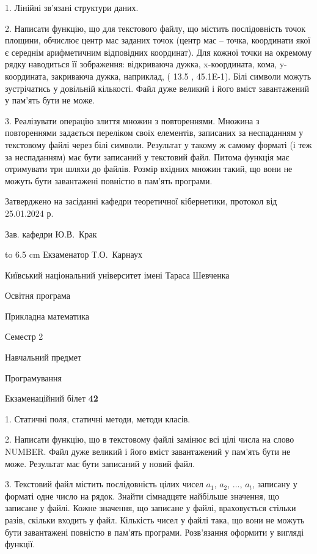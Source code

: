 \documentclass[12pt, ukrainian]{article}
\begin{document}
{%
1. Лінійні зв’язані структури даних.%
\par
2. Написати функцію, що для текстового файлу, що містить послідовність точок площини, обчислює центр мас заданих точок (центр мас -- точка, координати якої є середнім арифметичним відповідних координат). Для кожної точки на окремому рядку наводиться її зображення: відкриваюча дужка, x-координата, кома, y-координата, закриваюча дужка, наприклад, ( 13.5 , 45.1E-1). Білі символи можуть зустрічатись у довільній кількості. Файл дуже великий і його вміст завантажений у пам'ять бути не може.

\par
3. Реалізувати операцію злиття множин з повтореннями. Множина з повтореннями задається переліком своїх елементів, записаних за неспаданням у текстовому файлі через білі символи. Результат у такому ж самому форматі (і теж за неспаданням) має бути записаний у текстовий файл. Питома функція має отримувати три шляхи до файлів. Розмір вхідних множин такий, що вони не можуть бути завантажені повністю в пам’ять програми.

}
{\smallskip\smallskip \begin {scriptsize} Затверджено на засіданні кафедри теоретичної кібернетики, протокол   від   25.01.2024 р.\par\smallskip\smallskip\smallskip\smallskip
{\parbox {6.5 cm} {Зав. кафедри \dotfill Ю.В.~Крак}}\hspace {0.7cm} {\hbox to 6.5 cm { Екзаменатор \dotfill Т.О.~Карнаух}} \end{scriptsize}}
\vspace{0.9cm}
{{\begin {scriptsize}\par
{ \center  Київський національний університет імені Тараса Шевченка \par}
{\parbox {5 cm}{Освітня програма \hfill}{\parbox {7 cm}{Прикладна математика\hfill}}\parbox {6 cm}{\hfill Семестр 2}}\par
{\parbox {5 cm} {Навчальний предмет \hfill}\parbox {7 cm}{Програмування \hfill}\parbox {6cm}{\hfill}\par}\vspace{-15pt} \end{scriptsize}}{\center Екзаменаційний білет \No \textbf { 42 }\par}}
{%
1. Статичні поля, статичні методи, методи класів.%
\par
2. Написати функцію, що в текстовому файлі замінює всі цілі числа на слово NUMBER. Файл дуже великий і його вміст завантажений у пам'ять бути не може. Результат має бути записаний у новий файл.

\par
3. Текстовий файл містить послідовність цілих чисел $a_1$, $a_2$, $\ldots$, $a_t$, записану у форматі одне число на рядок. Знайти сімнадцяте найбільше значення, що записане у файлі. Кожне значення, що записане у файлі, враховується стільки разів, скільки входить у файл. Кількість чисел у файлі така, що вони не можуть бути завантажені повністю в пам'ять програми. Розв'язання оформити у вигляді функції.

}
\end{document}

